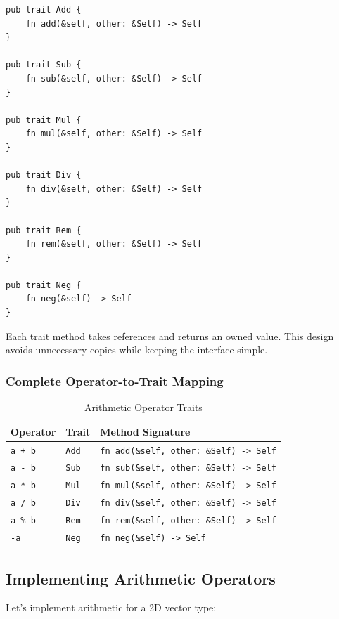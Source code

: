 \begin{lstlisting}
pub trait Add {
    fn add(&self, other: &Self) -> Self
}

pub trait Sub {
    fn sub(&self, other: &Self) -> Self
}

pub trait Mul {
    fn mul(&self, other: &Self) -> Self
}

pub trait Div {
    fn div(&self, other: &Self) -> Self
}

pub trait Rem {
    fn rem(&self, other: &Self) -> Self
}

pub trait Neg {
    fn neg(&self) -> Self
}
\end{lstlisting}

Each trait method takes references and returns an owned value. This design avoids unnecessary copies while keeping the interface simple.

\subsubsection{Complete Operator-to-Trait Mapping}

\begin{table}[h]
\centering
\begin{tabular}{lll}
\hline
\textbf{Operator} & \textbf{Trait} & \textbf{Method Signature} \\
\hline
\texttt{a + b} & \texttt{Add} & \texttt{fn add(\&self, other: \&Self) -> Self} \\
\texttt{a - b} & \texttt{Sub} & \texttt{fn sub(\&self, other: \&Self) -> Self} \\
\texttt{a * b} & \texttt{Mul} & \texttt{fn mul(\&self, other: \&Self) -> Self} \\
\texttt{a / b} & \texttt{Div} & \texttt{fn div(\&self, other: \&Self) -> Self} \\
\texttt{a \% b} & \texttt{Rem} & \texttt{fn rem(\&self, other: \&Self) -> Self} \\
\texttt{-a} & \texttt{Neg} & \texttt{fn neg(\&self) -> Self} \\
\hline
\end{tabular}
\caption{Arithmetic Operator Traits}
\end{table}

\subsection{Implementing Arithmetic Operators}

Let's implement arithmetic for a 2D vector type:


